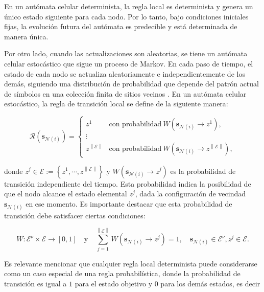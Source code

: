 En un autómata celular determinista, la regla local es determinista y genera un único estado siguiente para cada nodo. Por lo tanto, bajo condiciones iniciales fijas, la evolución futura del autómata es predecible y está determinada de manera única.

Por otro lado, cuando las actualizaciones son aleatorias, se tiene un autómata celular estocástico que sigue un proceso de Markov. En cada paso de tiempo, el estado de cada nodo se actualiza aleatoriamente e independientemente de los demás, siguiendo una distribución de probabilidad que depende del patrón actual de símbolos en una colección finita de sitios vecinos \cite{marcovici_ergodicity_2019}. En un autómata celular estocástico, la regla de transición local se define de la siguiente manera:

\begin{equation}\label{eq:47}
\mathcal{R}\left(\mathbf{s}_{\mathcal{N}(i)}\right) = \begin{cases}
	z^1& \text{con probabilidad} \ W\left(\mathbf{s}_{\mathcal{N}(i)}\rightarrow z^1\right),\\
	\vdots\\
	z^{\left\| \mathcal{E}\right\|} & \text{con probabilidad} \ W\left(\mathbf{s}_{\mathcal{N}(i)}\rightarrow z^{\left\| \mathcal{E}\right\|} \right),
\end{cases}
\end{equation}

donde $z^j \in \mathcal{E} := \left\{z^1,\cdots,z^{\left\|\mathcal{E} \right\| }\right\}$ y $W\left(\mathbf{s}_{\mathcal{N}(i)}\rightarrow z^j\right)$ es la probabilidad de transición independiente del tiempo.  Esta probabilidad indica la posibilidad de que el nodo alcance el estado elemental $z^j$, dada la configuración de vecindad $\mathbf{s}_{\mathcal{N}(i)}$ en ese momento. Es importante destacar que esta probabilidad de transición debe satisfacer ciertas condiciones:

\begin{equation}\label{eq:48}
W:\mathcal{E}^\nu\times\mathcal{E}\rightarrow[0,1] \quad \text{y} \quad  \sum_{j=1}^{\left\| \mathcal{E}\right\| }{W\left(\mathbf{s}_{\mathcal{N}(i)}\rightarrow z^j\right)}=1, \quad \mathbf{s}_{\mathcal{N}(i)}\in\mathcal{E}^\nu,z^j\in\mathcal{E}.
\end{equation}

Es relevante mencionar que cualquier regla local determinista puede considerarse como un caso especial de una regla probabilística, donde la probabilidad de transición es igual a $1$ para el estado objetivo y $0$ para los demás estados, es decir

